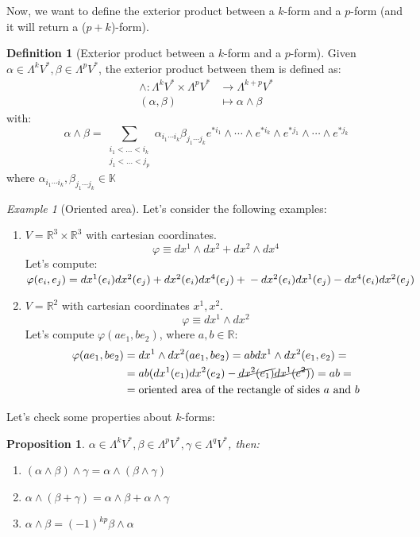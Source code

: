 \documentclass[a4paper,11pt,titlepage]{article}
\numberwithin{equation}{section}
\newtheorem{proposition}[theorem]{Proposition}
\theoremstyle{definition}
\newtheorem{definition}[theorem]{Definition}
\theoremstyle{remark}
\newtheorem{example}[theorem]{Example}
\newcommand{\rfield}{\mathbb{R}}
\begin{document}
Now, we want to define the exterior product between a $k$-form and a $p$-form (and it will return a ($p+k$)-form).

\begin{definition}[Exterior product between a $k$-form and a $p$-form]
  Given $\alpha \in \Lambda ^k V^*, \beta \in \Lambda^p V^*$, the exterior product between them is defined as:
  \begin{align}
    \wedge \colon \Lambda ^k V^* \times \Lambda ^p V^* &\rightarrow \Lambda^{k+p} V^* \nonumber \\
    (\alpha, \beta) &\mapsto \alpha \wedge \beta \nonumber
  \end{align}
  with:
  $$\alpha \wedge \beta = \sum\limits_{\substack{i_1 < \ldots < i_k \\ j_1 < \ldots < j_p}} \alpha_{i_1 \cdots i_k}\beta_{j_1 \cdots j_k} e^{*i_1} \wedge \cdots \wedge e^{*i_k} \wedge e^{*j_1} \wedge \cdots \wedge e^{*j_k} $$
  where $\alpha_{i_1 \cdots i_k},\beta_{j_1 \cdots j_k} \in \mathbb{K}$
\end{definition}

\begin{example}[Oriented area]
  Let's consider the following examples:
  \begin{enumerate}
    \item $V = \rfield^3 \times \rfield^3$ with cartesian coordinates.
    $$\varphi \equiv dx^1 \wedge dx^2 + dx^2 \wedge dx^4$$
    Let's compute: $\varphi(e_i, e_j) = dx^1(e_i) dx^2(e_j) + dx^2(e_i)dx^4(e_j) + \\ - dx^2(e_i)dx^1(e_j) - dx^4(e_i)dx^2(e_j)$
    \item $V = \rfield^2$ with cartesian coordinates $x^1, x^2$.
    $$\varphi \equiv dx^1 \wedge dx^2$$
    Let's compute $\varphi(ae_1, be_2)$, where $ a,b \in \rfield$:
    \begin{align*}
    \varphi(ae_1, be_2) &= dx^1 \wedge dx^2(ae_1, be_2) = ab dx^1 \wedge dx^2(e_1, e_2) = \\
    &= ab (dx^1(e_1)dx^2(e_2) - \cancel{dx^2(e_1)} \cancel{dx^1(e^2)}) = ab = \\
    &= \text{oriented area of the rectangle of sides } a \text{ and } b
  \end{align*}
  \end{enumerate}

\end{example}

Let's check some properties about $k$-forms:
\begin{proposition}
  $\alpha \in \Lambda^k V^*, \beta \in \Lambda^p V^*, \gamma \in \Lambda ^q V^*$, then:
  \begin{enumerate}
    \item $(\alpha \wedge \beta) \wedge \gamma = \alpha \wedge (\beta \wedge \gamma)$
    \item $\alpha \wedge (\beta + \gamma) = \alpha \wedge \beta + \alpha \wedge \gamma$
    \item $\alpha \wedge \beta = (-1)^{kp} \beta \wedge \alpha$
  \end{enumerate}
\end{proposition}
\newpage
\end{document}

